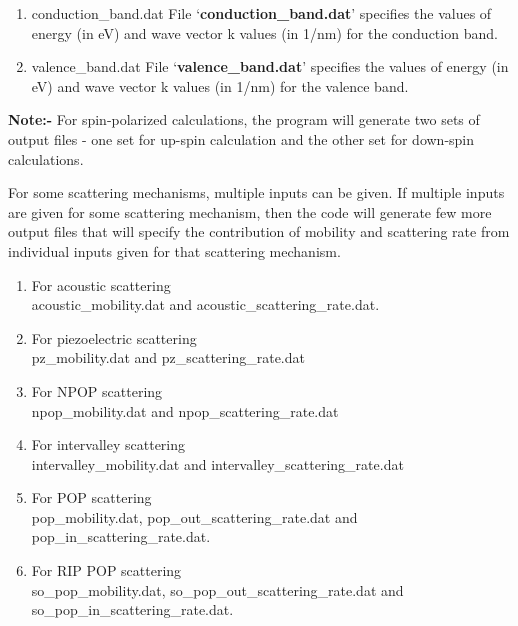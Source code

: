\documentclass[12pt]{article}
\begin{document}
\begin{enumerate}
\item conduction\_band.dat
\newline File \lq \textbf{conduction\_band.dat}\rq \hspace{0.5mm} specifies the values of energy (in eV) and wave vector k values (in 1/nm) for the conduction band.

\item valence\_band.dat
\newline File \lq \textbf{valence\_band.dat}\rq \hspace{0.5mm} specifies the values of energy (in eV) and wave vector k values (in 1/nm) for the valence band. 

\end{enumerate}
\textbf{Note:-} For spin-polarized calculations, the program will generate two sets of output files - one set for up-spin calculation and the other set for down-spin calculations. 
  
For some scattering mechanisms, multiple inputs can be given. If multiple inputs are given for some scattering mechanism, then the code will generate few more output files that will specify the contribution of mobility and scattering rate from individual inputs given for that scattering mechanism. 

\begin{enumerate}
    \item For acoustic scattering \\ acoustic\_mobility.dat  and acoustic\_scattering\_rate.dat. \\
    
    \item For piezoelectric scattering \\ pz\_mobility.dat and pz\_scattering\_rate.dat \\
    
    \item For NPOP scattering \\ 
    npop\_mobility.dat and npop\_scattering\_rate.dat 
    
    \item For intervalley scattering \\
    intervalley\_mobility.dat and intervalley\_scattering\_rate.dat 
        
    \item For POP scattering \\
    pop\_mobility.dat, pop\_out\_scattering\_rate.dat and pop\_in\_scattering\_rate.dat.
    
    \item For RIP POP scattering \\
    so\_pop\_mobility.dat, so\_pop\_out\_scattering\_rate.dat and so\_pop\_in\_scattering\_rate.dat. 
    
\end{enumerate}
\end{document}
